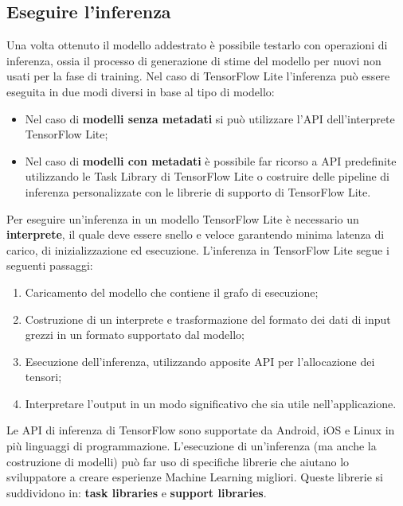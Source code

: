 \subsection{Eseguire l'inferenza}
Una volta ottenuto il modello addestrato è possibile testarlo con operazioni di inferenza, ossia il processo di generazione di stime del modello per nuovi
non usati per la fase di training. Nel caso di TensorFlow Lite l’inferenza può essere eseguita in due modi diversi in base al tipo di modello:
\begin{itemize}
    \item Nel caso di \textbf{modelli senza metadati} si può utilizzare l’API dell’interprete TensorFlow Lite;
    \item Nel caso di \textbf{modelli con metadati} è possibile far ricorso a API predefinite utilizzando le Task Library di TensorFlow Lite o
    costruire delle pipeline di inferenza personalizzate con le librerie di supporto di TensorFlow Lite.
\end{itemize}
Per eseguire un’inferenza in un modello TensorFlow Lite è necessario un \textbf{interprete}, il quale deve essere snello e veloce garantendo minima
latenza di carico, di inizializzazione ed esecuzione. L’inferenza in TensorFlow Lite segue i seguenti passaggi:
\begin{enumerate}
    \item Caricamento del modello che contiene il grafo di esecuzione;
    \item Costruzione di un interprete e trasformazione del formato dei dati di input grezzi in un formato supportato dal modello;
    \item Esecuzione dell’inferenza, utilizzando apposite API per l’allocazione dei tensori;
    \item Interpretare l’output in un modo significativo che sia utile nell’applicazione.
\end{enumerate}
Le API di inferenza di TensorFlow sono supportate da Android, iOS e Linux in più linguaggi di programmazione. L’esecuzione di un’inferenza (ma anche
la costruzione di modelli) può far uso di specifiche librerie che aiutano lo sviluppatore a creare esperienze Machine Learning migliori. 
Queste librerie si suddividono in: \textbf{task libraries} e \textbf{support libraries}.

